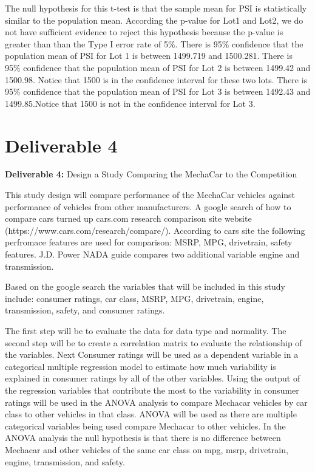 \documentclass[a4paper, 12pt]{article}\usepackage[]{graphicx}\usepackage[]{color}
\begin{document}
The null hypothesis for this t-test is that the sample mean for PSI is statistically similar to the population mean. According the p-value for Lot1 and Lot2, we do not have sufficient evidence to reject this hypothesis because the p-value is greater than than the Type I error rate of 5\%.
There is 95\% confidence that the population mean of PSI for Lot 1 is between 1499.719 and 1500.281. There is 95\% confidence that the population mean of PSI for Lot 2 is between 1499.42 and 1500.98. Notice that 1500 is in the confidence interval for these two lots. There is 95\% confidence that the population mean of PSI for Lot 3 is between 1492.43 and 1499.85.Notice that 1500 is not in the confidence interval for Lot 3. 


\section{Deliverable 4}
\textbf{Deliverable 4:} Design a Study Comparing the MechaCar to the Competition

This study design  will compare performance of the MechaCar vehicles against performance of vehicles from other manufacturers. A google search of how to compare cars turned up cars.com research comparison site website (https://www.cars.com/research/compare/). According to cars site the following perfromace features are used for comparison: MSRP, MPG, drivetrain, safety features. J.D. Power NADA guide compares two additional variable engine and transmission. 

Based on the google search the variables that will be included in this study include: consumer ratings, car class, MSRP, MPG, drivetrain, engine, transmission, safety, and consumer ratings. 

The first step will be to evaluate the data for data type and normality. 
The second step will be to create a correlation matrix to evaluate the relationship of the variables. 
Next Consumer ratings will be used as a dependent variable in a categorical multiple regression model to estimate how much variability is explained in consumer ratings by all of the other variables. 
Using the output of the regression variables that contribute the most to the variability in consumer ratings will be used in the ANOVA analysis to compare Mechacar vehicles by car class to other vehicles in that class. ANOVA will be used as there are multiple categorical variables being used compare Mechacar to other vehicles. 
In the ANOVA analysis the null hypothesis is that there is no difference between Mechacar and other vehicles of the same car class on mpg, msrp, drivetrain, engine, transmission, and safety. 
\end{document}
